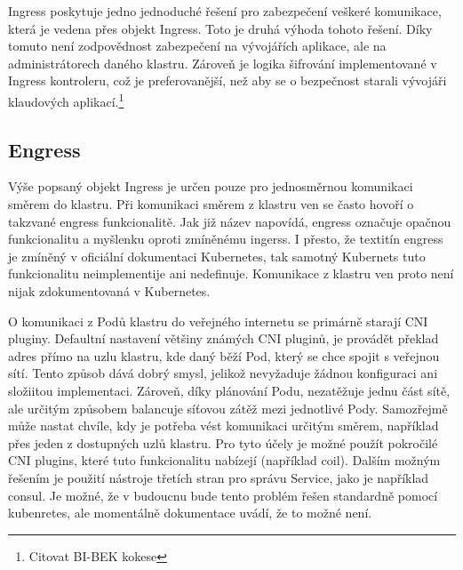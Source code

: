 Ingress poskytuje jedno jednoduché řešení pro zabezpečení veškeré komunikace, která je vedena přes objekt Ingress. Toto je druhá výhoda tohoto řešení. Díky tomuto není zodpovědnost zabezpečení na vývojářích aplikace, ale na administrátorech daného klastru. Zároveň je logika šifrování implementované v Ingress kontroleru, což je preferovanější, než aby se o bezpečnost starali vývojáři klaudových aplikací.\footnote{Citovat BI-BEK kokese}

\subsection{Engress}
Výše popsaný objekt Ingress je určen pouze pro jednosměrnou komunikaci směrem do klastru. Při komunikaci směrem z klastru ven se často hovoří o takzvané engress funkcionalitě. Jak již název napovídá, engress označuje opačnou funkcionalitu a myšlenku oproti zmíněnému ingerss. I přesto, že textitín engress je zmíněný v oficiální dokumentaci Kubernetes, tak samotný Kubernets tuto funkcionalitu neimplementije ani nedefinuje. Komunikace z klastru ven proto není nijak zdokumentovaná v Kubernetes.

O komunikaci z Podů klastru do veřejného internetu se primárně starají CNI pluginy. Defaultní nastavení většiny známých CNI pluginů, je provádět překlad adres přímo na uzlu klastru, kde daný běží Pod, který se chce spojit s veřejnou sítí. Tento způsob dává dobrý smysl, jelikož nevyžaduje žádnou konfiguraci ani složiitou implementaci. Zároveň, díky plánování Podu, nezatěžuje jednu část sítě, ale určitým způsobem balancuje síťovou zátěž mezi jednotlivé Pody. Samozřejmě může nastat chvíle, kdy je potřeba vést komunikaci určitým směrem, například přes jeden z dostupných uzlů klastru. Pro tyto účely je možné použít pokročilé CNI plugins, které tuto funkcionalitu nabízejí (například coil)\cite{yamamoto_2020_introducing}. Dalším možným řešením je použití nástroje třetích stran pro správu Service, jako je například consul. Je možné, že v budoucnu bude tento problém řešen standardně pomocí kubenretes, ale momentálně dokumentace uvádí, že to možné není.\cite{thekubernetesauthors_2022_network}




